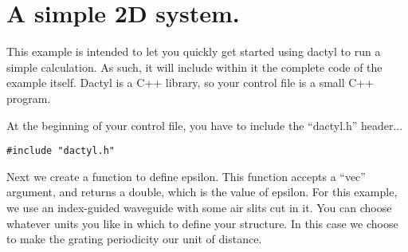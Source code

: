 \begin{comment}
/*
\end{comment}
\section{A simple 2D system.}
\begin{comment}
*/
\end{comment}

This example is intended to let you quickly get started using dactyl to run
a simple calculation.  As such, it will include within it the complete code
of the example itself.  Dactyl is a C++ library, so your control file is a
small C++ program.

At the beginning of your control file, you have to include the ``dactyl.h''
header...
\begin{verbatim}
#include "dactyl.h"
\end{verbatim}

Next we create a function to define epsilon.  This function accepts a
``vec'' argument, and returns a double, which is the value of epsilon.  For
this example, we use an index-guided waveguide with some air slits cut in
it.  You can choose whatever units you like in which to define your
structure.  In this case we choose to make the grating periodicity our unit
of distance.

